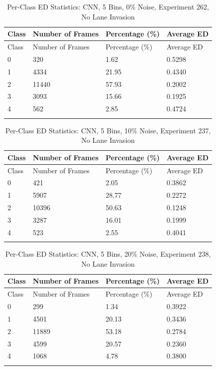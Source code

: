 

\begin{longtable}{@{}llll@{}}
\toprule
Class & Number of Frames & Percentage (\%) & Average ED \\
\midrule
\endfirsthead
\toprule
Class & Number of Frames & Percentage (\%) & Average ED \\
\midrule
\endhead
0 & 320 & 1.62 & 0.5298 \\
1 & 4334 & 21.95 & 0.4340 \\
2 & 11440 & 57.93 & 0.2002 \\
3 & 3093 & 15.66 & 0.1925 \\
4 & 562 & 2.85 & 0.4724 \\
\bottomrule
\caption{Per-Class ED Statistics: CNN, 5 Bins, 0\% Noise, Experiment 262, No Lane Invasion}
\label{tab:exp262_CNN_5bins_0noise}
\end{longtable}


\begin{longtable}{@{}llll@{}}
\toprule
Class & Number of Frames & Percentage (\%) & Average ED \\
\midrule
\endfirsthead
\toprule
Class & Number of Frames & Percentage (\%) & Average ED \\
\midrule
\endhead
0 & 421 & 2.05 & 0.3862 \\
1 & 5907 & 28.77 & 0.2272 \\
2 & 10396 & 50.63 & 0.1248 \\
3 & 3287 & 16.01 & 0.1999 \\
4 & 523 & 2.55 & 0.4041 \\
\bottomrule
\caption{Per-Class ED Statistics: CNN, 5 Bins, 10\% Noise, Experiment 237, No Lane Invasion}
\label{tab:exp237_CNN_5bins_10noise}
\end{longtable}
        


\begin{longtable}{@{}llll@{}}
\toprule
Class & Number of Frames & Percentage (\%) & Average ED \\
\midrule
\endfirsthead
\toprule
Class & Number of Frames & Percentage (\%) & Average ED \\
\midrule
\endhead
0 & 299 & 1.34 & 0.3922 \\
1 & 4501 & 20.13 & 0.3436 \\
2 & 11889 & 53.18 & 0.2784 \\
3 & 4599 & 20.57 & 0.2360 \\
4 & 1068 & 4.78 & 0.3800 \\
\bottomrule
\caption{Per-Class ED Statistics: CNN, 5 Bins, 20\% Noise, Experiment 238, No Lane Invasion}
\label{tab:exp238_CNN_5bins_20noise}
\end{longtable}
        

